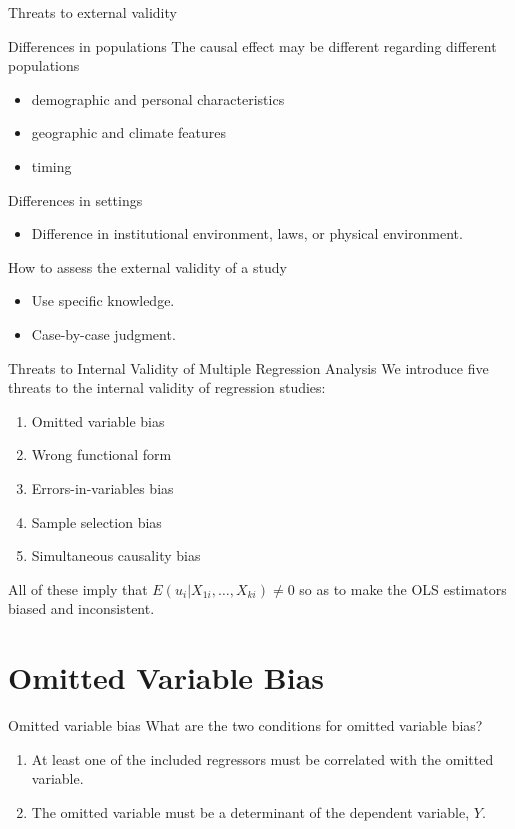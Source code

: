 \documentclass[presentation,10pt]{beamer}
\begin{document}
\begin{frame}[label={sec:org3a5804e}]{Threats to external validity}
\begin{block}{Differences in populations}
The causal effect may be different regarding different populations
\begin{itemize}
\item demographic and personal characteristics
\item geographic and climate features
\item timing
\end{itemize}
\end{block}

\begin{block}{Differences in settings}
\begin{itemize}
\item Difference in institutional environment, laws, or physical
environment.
\end{itemize}
\end{block}

\begin{block}{How to assess the external validity of a study}
\begin{itemize}
\item Use specific knowledge.
\item Case-by-case judgment.
\end{itemize}
\end{block}
\end{frame}

\begin{frame}[label={sec:orgca16e2e}]{Threats to Internal Validity of Multiple Regression Analysis}
We introduce five threats to the internal validity of regression studies:
\begin{enumerate}
\item Omitted variable bias
\item Wrong functional form
\item Errors-in-variables bias
\item Sample selection bias
\item Simultaneous causality bias
\end{enumerate}

\vspace{0.3cm} 
All of these imply that \(E(u_i|X_{1i},…,X_{ki}) \neq 0\) so as to make
the OLS estimators biased and inconsistent.  
\end{frame}

\section{Omitted Variable Bias}
\label{sec:orgb2fba87}
\begin{frame}[label={sec:org0e67561}]{Omitted variable bias}
What are the two conditions for omitted variable bias?
\pause
\begin{enumerate}
\item At least one of the included regressors must be correlated with the
omitted variable.
\item The omitted variable must be a determinant of the dependent
variable, \(Y\).
\end{enumerate}
\end{frame}
\end{document}
